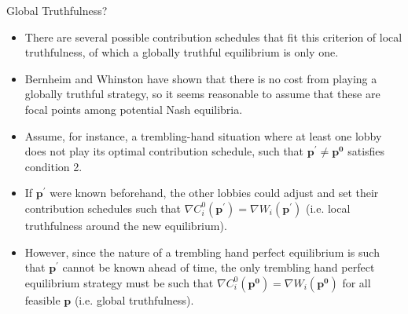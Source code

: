 \documentclass[aspectratio=169]{beamer}
\begin{document}

\begin{frame}{Global Truthfulness?}

\begin{itemize}
    \item<1-> There are several possible contribution schedules that fit this criterion of local truthfulness, of which a globally truthful equilibrium is only one.
    \item<2-> Bernheim and Whinston have shown that there is no cost from playing a globally truthful strategy, so it seems reasonable to assume that these are focal points among potential Nash equilibria.
    \item<3-> Assume, for instance, a trembling-hand situation where at least one lobby does not play its optimal contribution schedule, such that $ \mathbf{p^{'}} \neq \mathbf{p^{0}} $ satisfies condition 2.
    \item<4-> If $ \mathbf{p^{'}} $ were known beforehand, the other lobbies could adjust and set their contribution schedules such that $ \nabla C_{i}^{0}\left( \mathbf{p^{'}} \right) = \nabla W_{i}\left( \mathbf{p^{'}} \right) $ (i.e. local truthfulness around the new equilibrium).
    \item<5-> However, since the nature of a trembling hand perfect equilibrium is such that $ \mathbf{p^{'}} $ cannot be known ahead of time, the only trembling hand perfect equilibrium strategy must be such that $ \nabla C_{i}^{0}\left( \mathbf{p^{0}} \right) = \nabla W_{i}\left( \mathbf{p^{0}} \right) $ for all feasible $ \mathbf{p} $ (i.e. global truthfulness).
\end{itemize}
    
\end{frame}

\end{document}
